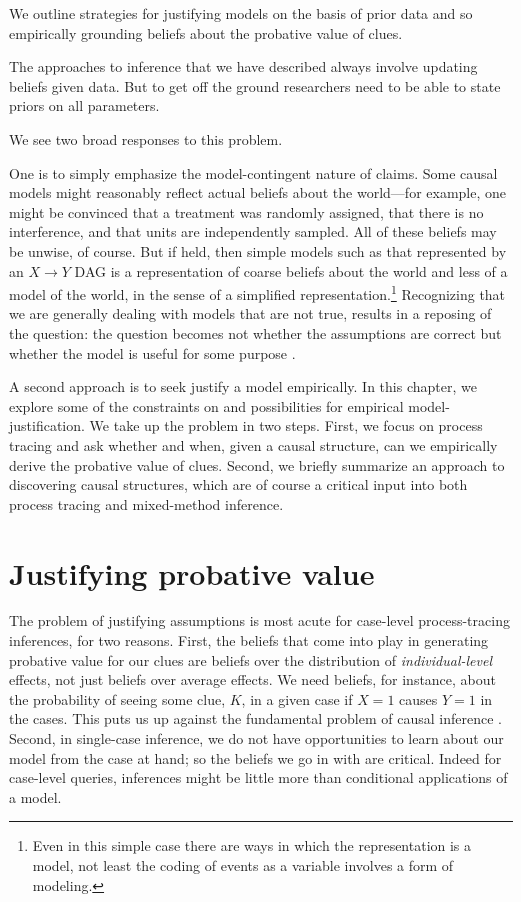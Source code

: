 \documentclass[
  12pt,
]{book}
\newenvironment{headerbox}{
  \definecolor{shadecolor}{rgb}{0.8, 0.8, 0.8}  %
  \color{black}
  \begin{shaded}}{\end{shaded}}
\begin{document}
\begin{headerbox}
We outline strategies for justifying models on the basis of prior data and so empirically grounding beliefs about the probative value of clues.

\end{headerbox}

The approaches to inference that we have described always involve updating beliefs given data. But to get off the ground researchers need to be able to state priors on all parameters.

We see two broad responses to this problem.

One is to simply emphasize the model-contingent nature of claims. Some causal models might reasonably reflect actual beliefs about the world---for example, one might be convinced that a treatment was randomly assigned, that there is no interference, and that units are independently sampled. All of these beliefs may be unwise, of course. But if held, then simple models such as that represented by an \(X \rightarrow Y\) DAG is a representation of coarse beliefs about the world and less of a model of the world, in the sense of a simplified representation.\footnote{Even in this simple case there are ways in which the representation is a model, not least the coding of events as a variable involves a form of modeling.} Recognizing that we are generally dealing with models that are not true, results in a reposing of the question: the question becomes not whether the assumptions are correct but whether the model is useful for some purpose \citep{clarke2012model}.

A second approach is to seek justify a model empirically. In this chapter, we explore some of the constraints on and possibilities for empirical model-justification. We take up the problem in two steps. First, we focus on process tracing and ask whether and when, given a causal structure, can we empirically derive the probative value of clues. Second, we briefly summarize an approach to discovering causal structures, which are of course a critical input into both process tracing and mixed-method inference.

\hypertarget{justifying-probative-value}{%
\section{Justifying probative value}\label{justifying-probative-value}}

The problem of justifying assumptions is most acute for case-level process-tracing inferences, for two reasons. First, the beliefs that come into play in generating probative value for our clues are beliefs over the distribution of \emph{individual-level} effects, not just beliefs over average effects. We need beliefs, for instance, about the probability of seeing some clue, \(K\), in a given case if \(X=1\) causes \(Y=1\) in the cases. This puts us up against the fundamental problem of causal inference \citep{holland1986statistics}. Second, in single-case inference, we do not have opportunities to learn about our model from the case at hand; so the beliefs we go in with are critical. Indeed for case-level queries, inferences might be little more than conditional applications of a model.
\end{document}
